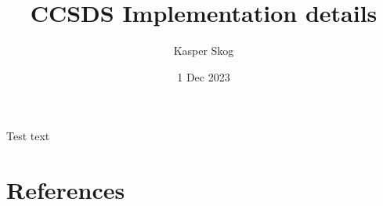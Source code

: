 \documentclass[12pt, a4paper]{article}
\title{CCSDS Implementation details}
\author{Kasper Skog}
\date{1 Dec 2023}
\begin{document}
\maketitle

Test text\cite{test}

\section{References}
\listoffigures


\end{document}
